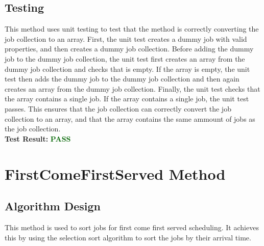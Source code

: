 \documentclass[12pt,a4paper]{article}
\begin{document}
		\subsection{Testing}
			This method uses unit testing to test that the method is correctly converting the job 
			collection to an array. First, the unit test creates a dummy job with valid properties, and 
			then creates a dummy job collection. Before adding the dummy job to the dummy job collection, 
			the unit test first creates an array from the dummy job collection and checks that is empty. 
			If the array is empty, the unit test then adds the dummy job to the dummy job collection and 
			then again creates an array from the dummy job collection. Finally, the unit test checks that 
			the array contains a single job. If the array contains a single job, the unit test passes. 
			This ensures that the job collection can correctly convert the job collection to an array, and 
			that the array contains the same ammount of jobs as the job collection.\\

			\textbf{Test Result:} \textbf{\textcolor{darkgreen}{PASS}}\\

	\newpage
	
	\section{FirstComeFirstServed Method}
		\subsection{Algorithm Design}
			This method is used to sort jobs for first come first served scheduling. It achieves 
			this by using the selection sort algorithm to sort the jobs by their arrival time.\\
\end{document}
